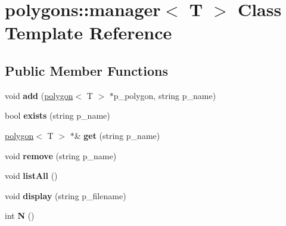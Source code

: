 \hypertarget{classpolygons_1_1manager}{\section{polygons\-:\-:manager$<$ T $>$ Class Template Reference}
\label{classpolygons_1_1manager}
}
\subsection*{Public Member Functions}
\begin{DoxyCompactItemize}
\item 
\hypertarget{classpolygons_1_1manager_a78d63452e32a64e5796b51a08f5b2b68}{void {\bfseries add} (\hyperlink{classpolygons_1_1polygon}{polygon}$<$ T $>$ $\ast$p\-\_\-polygon, string p\-\_\-name)}\label{classpolygons_1_1manager_a78d63452e32a64e5796b51a08f5b2b68}

\item 
\hypertarget{classpolygons_1_1manager_ac1f2398e33cc6ca111edd542fce62f70}{bool {\bfseries exists} (string p\-\_\-name)}\label{classpolygons_1_1manager_ac1f2398e33cc6ca111edd542fce62f70}

\item 
\hypertarget{classpolygons_1_1manager_ae9ed98c7b184436a64ba8a3c837023af}{\hyperlink{classpolygons_1_1polygon}{polygon}$<$ T $>$ $\ast$\& {\bfseries get} (string p\-\_\-name)}\label{classpolygons_1_1manager_ae9ed98c7b184436a64ba8a3c837023af}

\item 
\hypertarget{classpolygons_1_1manager_a0f18da8804c0314a8b7be0737324b14b}{void {\bfseries remove} (string p\-\_\-name)}\label{classpolygons_1_1manager_a0f18da8804c0314a8b7be0737324b14b}

\item 
\hypertarget{classpolygons_1_1manager_a36fb469747b78c08c02e762b7a97e7fb}{void {\bfseries list\-All} ()}\label{classpolygons_1_1manager_a36fb469747b78c08c02e762b7a97e7fb}

\item 
\hypertarget{classpolygons_1_1manager_a9eb125d146b0918f6be7a9906a12f5f6}{void {\bfseries display} (string p\-\_\-filename)}\label{classpolygons_1_1manager_a9eb125d146b0918f6be7a9906a12f5f6}

\item 
\hypertarget{classpolygons_1_1manager_aaeda64d252e495c66322fcb08bb428d0}{int {\bfseries N} ()}\label{classpolygons_1_1manager_aaeda64d252e495c66322fcb08bb428d0}

\end{DoxyCompactItemize}

